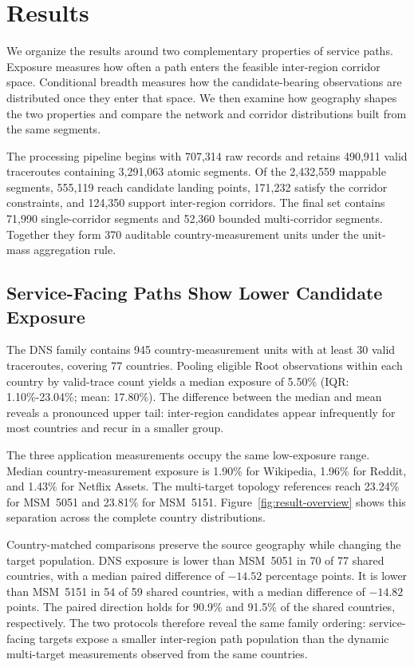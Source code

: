 \section{Results}
\label{sec:result}

We organize the results around two complementary properties of service paths.
Exposure measures how often a path enters the feasible inter-region corridor
space. Conditional breadth measures how the candidate-bearing observations are
distributed once they enter that space. We then examine how geography shapes
the two properties and compare the network and corridor distributions built
from the same segments.

The processing pipeline begins with 707,314 raw records and retains 490,911
valid traceroutes containing 3,291,063 atomic segments. Of the 2,432,559
mappable segments, 555,119 reach candidate landing points, 171,232 satisfy the
corridor constraints, and 124,350 support inter-region corridors. The final set
contains 71,990 single-corridor segments and 52,360 bounded multi-corridor
segments. Together they form 370 auditable country-measurement units under the
unit-mass aggregation rule.

\subsection{Service-Facing Paths Show Lower Candidate Exposure}
\label{subsec:overall-exposure}

The DNS family contains 945 country-measurement units with at least 30 valid
traceroutes, covering 77 countries. Pooling eligible Root observations within
each country by valid-trace count yields a median exposure of 5.50\% (IQR:
1.10\%-23.04\%; mean: 17.80\%). The difference between the median and mean
reveals a pronounced upper tail: inter-region candidates appear infrequently
for most countries and recur in a smaller group.

The three application measurements occupy the same low-exposure range. Median
country-measurement exposure is 1.90\% for Wikipedia, 1.96\% for Reddit, and
1.43\% for Netflix Assets. The multi-target topology references reach 23.24\%
for MSM~5051 and 23.81\% for MSM~5151. Figure~\ref{fig:result-overview} shows
this separation across the complete country distributions.

Country-matched comparisons preserve the source geography while changing the
target population. DNS exposure is lower than MSM~5051 in 70 of 77 shared
countries, with a median paired difference of \(-14.52\) percentage points. It
is lower than MSM~5151 in 54 of 59 shared countries, with a median difference
of \(-14.82\) points. The paired direction holds for 90.9\% and 91.5\% of the
shared countries, respectively. The two protocols therefore reveal the same
family ordering: service-facing targets expose a smaller inter-region path
population than the dynamic multi-target measurements observed from the same
countries.

